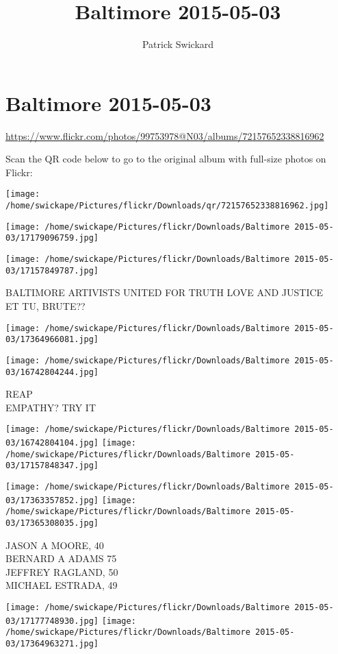 \documentclass[10pt,letterpaper]{article}
\title{Baltimore 2015-05-03}
\author{Patrick Swickard}
\date{}
\begin{document}
\section*{Baltimore 2015-05-03}

\url{https://www.flickr.com/photos/99753978@N03/albums/72157652338816962}

Scan the QR code below to go to the original album with full-size photos on Flickr:

\texttt{[image: /home/swickape/Pictures/flickr/Downloads/qr/72157652338816962.jpg]}
\pagebreak

\texttt{[image: /home/swickape/Pictures/flickr/Downloads/Baltimore 2015-05-03/17179096759.jpg]}

\vspace{0.25in}
\texttt{[image: /home/swickape/Pictures/flickr/Downloads/Baltimore 2015-05-03/17157849787.jpg]}

BALTIMORE ARTIVISTS UNITED FOR TRUTH LOVE AND JUSTICE\\
ET TU, BRUTE??
\pagebreak

\texttt{[image: /home/swickape/Pictures/flickr/Downloads/Baltimore 2015-05-03/17364966081.jpg]}

\vspace{0.25in}
\texttt{[image: /home/swickape/Pictures/flickr/Downloads/Baltimore 2015-05-03/16742804244.jpg]}

REAP\\
EMPATHY?  TRY IT
\pagebreak

\texttt{[image: /home/swickape/Pictures/flickr/Downloads/Baltimore 2015-05-03/16742804104.jpg]}
\texttt{[image: /home/swickape/Pictures/flickr/Downloads/Baltimore 2015-05-03/17157848347.jpg]}

\texttt{[image: /home/swickape/Pictures/flickr/Downloads/Baltimore 2015-05-03/17363357852.jpg]}
\texttt{[image: /home/swickape/Pictures/flickr/Downloads/Baltimore 2015-05-03/17365308035.jpg]}

JASON A MOORE, 40\\
BERNARD A ADAMS 75\\
JEFFREY RAGLAND, 50\\
MICHAEL ESTRADA, 49
\pagebreak

\texttt{[image: /home/swickape/Pictures/flickr/Downloads/Baltimore 2015-05-03/17177748930.jpg]}
\texttt{[image: /home/swickape/Pictures/flickr/Downloads/Baltimore 2015-05-03/17364963271.jpg]}
\end{document}
